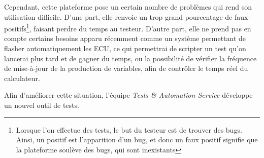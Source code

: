 			Cependant, cette plateforme pose un certain nombre de problèmes qui rend son utilisation difficile. D'une part, elle renvoie un trop grand pourcentage de faux-positifs\footnote{Lorsque l'on effectue des tests, le but du testeur est de trouver des bugs. Ainsi, un positif est l'apparition d'un bug, et donc un faux positif signifie que la plateforme soulève des bugs, qui sont inexistants}, faisant perdre du temps au testeur. D'autre part, elle ne prend pas en compte certains besoins apparu récemment comme un système permettant de flasher automatiquement les ECU, ce qui permettrai de scripter un test qu'on lancerai plus tard et de gagner du temps, ou la possibilité de vérifier la fréquence de mise-à-jour de la production de variables, afin de contrôler le temps réel du calculateur.
			
			Afin d'améliorer cette situation, l'équipe \textit{Tests \& Automation Service} développe un nouvel outil de tests.
			
